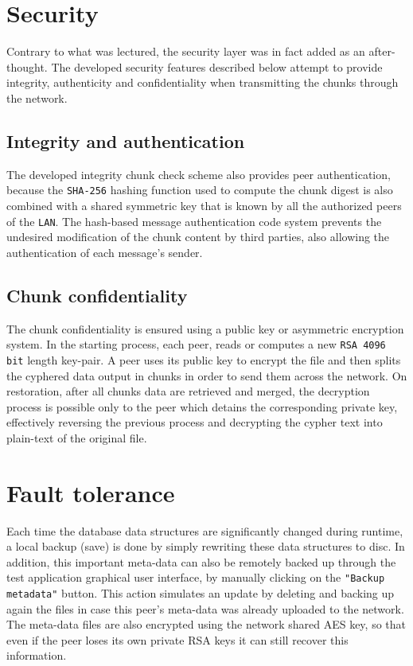 \documentclass[a4paper,11pt]{article}
\begin{document}
\section{Security}
Contrary to what was lectured, the security layer was in fact added as an after-thought. The developed security features described below attempt to provide integrity, authenticity and confidentiality when transmitting the chunks through the network.

\subsection{Integrity and authentication}
The developed integrity chunk check scheme also provides peer authentication, because the \texttt{SHA-256} hashing function used to compute the chunk digest is also combined with a shared symmetric key that is known by all the authorized peers of the \texttt{LAN}. The hash-based message authentication code system prevents the undesired modification of the chunk content by third parties, also allowing the authentication of each message's sender. 

\subsection{Chunk confidentiality}
The chunk confidentiality is ensured using a public key or asymmetric encryption system. In the starting process, each peer, reads or computes a new \texttt{RSA 4096 bit} length key-pair. A peer uses its public key to encrypt the file and then splits the cyphered data output in chunks in order to send them across the network. On restoration, after all chunks data are retrieved and merged, the decryption process is possible only to the peer which detains the corresponding private key, effectively reversing the previous process and decrypting the cypher text into plain-text of the original file.

\section{Fault tolerance}
Each time the database data structures are significantly changed during runtime, a local backup (save) is done by simply rewriting these data structures to disc. In addition, this important meta-data can also be remotely backed up through the test application graphical user interface, by manually clicking on the \texttt{"Backup metadata"} button. This action simulates an update by deleting and backing up again the files in case this peer's meta-data was already uploaded to the network. The meta-data files are also encrypted using the network shared AES key, so that even if the peer loses its own private RSA keys it can still recover this information.
\end{document}
